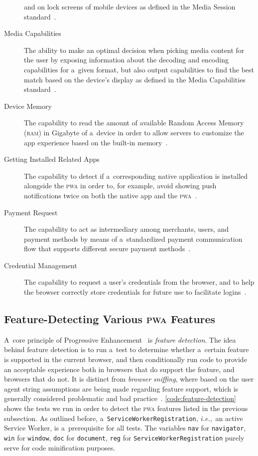 \documentclass[sigconf,hyphens]{acmart}
\begin{document}
\begin{description}
    and on lock screens of mobile devices
    as defined in the Media Session standard~\cite{lamouri2017mediasessionapi}.
  \item[Media Capabilities] The ability to make an optimal decision
    when picking media content for the user by exposing information
    about the decoding and encoding capabilities for a~given format,
    but also output capabilities to find the best match based on the device's display
    as defined in the Media Capabilities standard~\cite{lamouri2017mediacapabilities}.
  \item[Device Memory] The capability to read the amount of available
    Random Access Memory (\textsc{ram}) in Gigabyte
    of a~device in order to allow servers to customize the app experience
    based on the built-in memory~\cite{panicker2017devicememory}.
  \item[Getting Installed Related Apps] The capability to detect if a~corresponding
    native application is installed alongside the \textsc{pwa} in order to,
    for example, avoid showing push notifications twice
    on both the native app and the \textsc{pwa}~\cite{kinlan2017relatedapps}.
  \item[Payment Request] The capability to act as intermediary among merchants,
    users, and payment methods by means of a~standardized payment communication flow
    that supports different secure payment methods~\cite{bateman2017paymentrequest}.
  \item[Credential Management] The capability to request a user's credentials
    from the browser, and to help the browser correctly store credentials
    for future use to facilitate logins~\cite{west2017credentialmanagement}.
\end{description} 

\subsection{Feature-Detecting Various \textsc{pwa} Features}

A~core principle of Progressive Enhancement~\cite{champeon2003progressiveenhancement}
is \emph{feature detection}.
The idea behind feature detection is to run a~test to determine
whether a~certain feature is supported in the current browser,
and then conditionally run code to provide an acceptable experience
both in browsers that do support the feature, and browsers that do not.
It is distinct from \emph{browser sniffing}, where based on the user agent string
assumptions are being made regarding feature support,
which is generally considered problematic and bad practice~\cite{andersen2008useragent}.
\autoref{code:feature-detection} shows the tests
we run in order to detect the \textsc{pwa} features listed in the previous subsection.
As outlined before, a~\texttt{ServiceWorkerRegistration},
\emph{i.e.},\ an active Service Worker, is a~prerequisite for all tests.  
The variables \texttt{nav} for \texttt{navigator},
\texttt{win} for \texttt{window}, \texttt{doc} for \texttt{document},
\texttt{reg} for \texttt{ServiceWorkerRegistration}
purely serve for code minification purposes.
\end{document}
